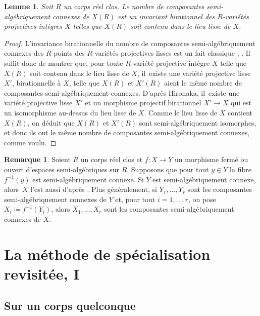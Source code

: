 \documentclass[11pt]{article}
\newtheorem{lemma}[thm]{Lemme}
\theoremstyle{definition}
\newtheorem{rmk}[thm]{Remarque}
\begin{document}
\begin{lemma}\label{connexe-invariant}
Soit $R$ un corps réel clos. Le nombre de composantes semi-algébri\-quement connexes de $X(R)$ est un invariant birationnel des $R$-variétés projectives intègres $X$ telles que $X(R)$ soit contenu dans le lieu lisse de $X$.
\end{lemma}

\begin{proof}
L'invariance birationnelle du nombre de composantes semi-algé\-briquement connexes des $R$-points des $R$-variétés projectives lisses est un fait classique \cite[\S 13]{delfs1981semialgebraicII}, \cite[Th.\,3.4.12]{bochnak1998real}. Il suffit donc de montrer que, pour toute $R$-variété projective intègre $X$ telle que $X(R)$ soit contenu dans le lieu lisse de $X$, il~existe une variété projective lisse $X'$, birationnelle à $X$, telle que $X(R)$ et $X'(R)$ aient le même nombre de composantes semi-algébriquement connexes. D'après Hironaka, il~existe une variété projective lisse $X'$ et un morphisme projectif birationnel $X'\to X$ qui est un isomorphisme au-dessus du lieu lisse de $X$. Comme le lieu lisse de $X$ contient $X(R)$, on déduit que $X(R)$ et $X'(R)$ sont semi-algébriquement isomorphes, et donc ils ont le même nombre de composantes semi-algébriquement connexes, comme voulu.
\end{proof}

\begin{rmk}\label{fibres-connexes}
Soient $R$ un corps réel clos et $f\colon X\to Y$ un morphisme fermé ou ouvert d'espaces semi-algébriques sur $R$. Supposons que pour tout $y\in Y$ la fibre $f^{-1}(y)$ est semi-algébriquement connexe. Si $Y$ est semi-algébriquement connexe, alors~$X$ l'est aussi d'après \cite[Exer.\,4.4.1(a)]{scheiderer2024course}. Plus généralement, si $Y_1,\dots,Y_r$ sont les composantes semi-algébriquement connexes de $Y$ et, pour tout $i=1,\dots,r$, on pose $X_i\coloneqq f^{-1}(Y_i)$, alors $X_1,\dots,X_r$ sont les composantes semi-algébriquement connexes de $X$.
\end{rmk}

\section{La méthode de spécialisation revisitée, I}
\label{parasp}

\subsection{Sur un corps quelconque}
\end{document}
